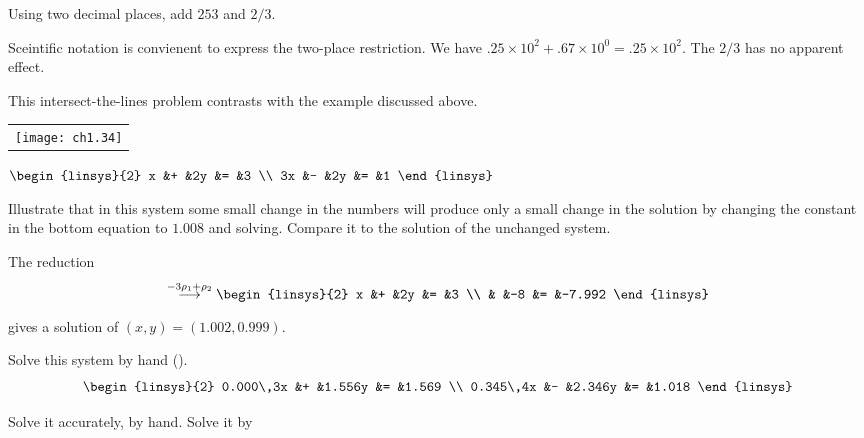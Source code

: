 \begin{exercises}
  \item 
    Using two decimal places, add $253$ and $2/3$.
    \begin{answer}
      Sceintific notation is convienent to express the two-place restriction.
      We have $.25\times 10^{2}+.67\times 10^{0}=.25\times 10^{2}$.
      The $2/3$ has no apparent effect.
    \end{answer}
  \item 
    This intersect-the-lines problem contrasts with the example
    discussed above.
    \begin{center}
      \begin{tabular}{@{}c@{}}
        \texttt{[image: ch1.34]}
      \end{tabular}
      \qquad
      $\displaystyle \begin{linsys}{2}
            x &+ &2y &= &3  \\
            3x &- &2y &= &1
      \end{linsys}$
    \end{center}
    Illustrate that in this system 
    some small change in the numbers will produce only a
    small change in the solution by changing the constant in the
    bottom equation to $1.008$ and solving.
    Compare it to the solution of the unchanged system.
    \begin{answer}
      The reduction
      \begin{equation*}
        \grstep{-3\rho_1+\rho_2}
        \begin{linsys}{2}
          x  &+  &2y  &=  &3  \\
             &   &-8  &=  &-7.992
        \end{linsys}
      \end{equation*}
      gives a solution of \( (x,y)=(1.002,0.999) \).
    \end{answer}
  \item 
    Solve this system by hand (\cite{Rice}).
    \begin{equation*}
      \begin{linsys}{2}
        0.000\,3x  &+  &1.556y  &=  &1.569 \\
        0.345\,4x  &-  &2.346y  &=  &1.018
      \end{linsys}
    \end{equation*}
    \begin{exparts*}
      \partsitem Solve it accurately, by hand.
      \partsitem Solve it by

\end{exparts*}
\end{exercises}
